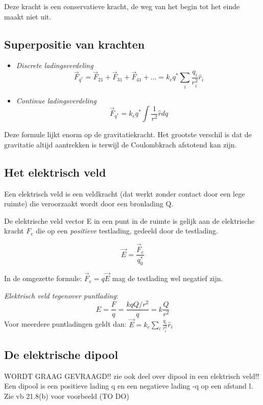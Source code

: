 \documentclass[12pt,a4paper]{article}
\begin{document}
	Deze kracht is een conservatieve kracht, de weg van het begin tot het einde maakt niet uit. 
	\newline
	
	\subsection{Superpositie van krachten}
	\begin{itemize}
		\item \textit{Discrete ladingsverdeling} 
		\[\vec{F}_{q^*} = \vec{F}_{21} + \vec{F}_{31} + \vec{F}_{41} + ... = k_eq^*\sum_i \frac{q_i}{r_i^2}\hat{r}_i\]
		\item \textit{Continue ladingsverdeling}
		\[\vec{F}_{q^*} = k_eq^* \int\frac{1}{r^2}\hat{r}dq\]
	\end{itemize}
    Deze formule lijkt enorm op de gravitatiekracht. Het grootste verschil is dat de gravitatie altijd aantrekken is terwijl de Coulombkrach afstotend kan zijn.
    
    \subsection{Het elektrisch veld}
    Een elektrisch veld is een veldkracht (dat werkt zonder contact door een lege ruimte) die veroorzaakt wordt door een bronlading Q.
    
    De elektrische veld vector E in een punt in de ruimte is gelijk aan de elektrische kracht $F_e$ die op een \textit{positieve} testlading, gedeeld door de testlading.
    
    \[\vec{E} = \frac{\vec{F}_e}{q_0^*}\]
    
    In de omgezette formule: \(\vec{F}_e = q\vec{E}\) mag de testlading wel negatief zijn. 
    
    \textit{Elektrisch veld tegenover puntlading}:
    \[E = \frac{F}{q} = \frac{kqQ/r^2}{q} = k\frac{Q}{r^2}\]
    Voor meerdere puntladingen geldt dan: \(\vec{E} = k_e \sum_i \frac{q_i}{r_i^2}\hat{r}_i\)
    
    \subsection{De elektrische dipool}%
    WORDT GRAAG GEVRAAGD!! zie ook deel over dipool in een elektrisch veld!!
    \newline
    Een dipool is een positieve lading q en een negatieve lading -q op een afstand l. Zie vb 21.8(b) voor voorbeeld (TO DO)
	
\end{document}
